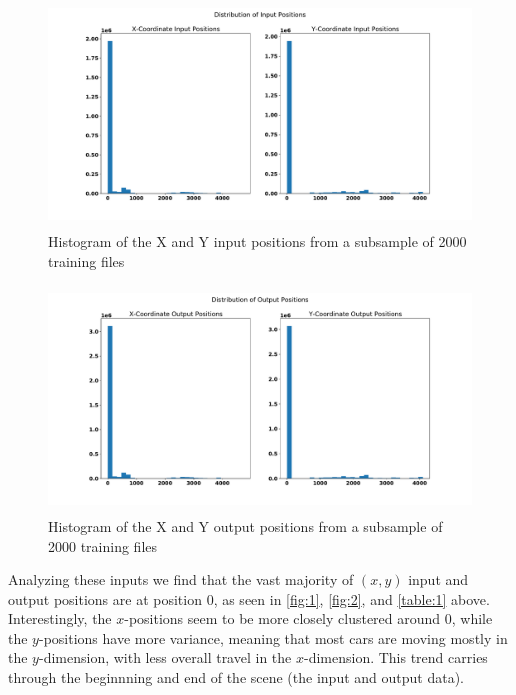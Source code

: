 \documentclass{article}
\begin{document}
        \begin{figure}[H]
            \centering
            \includegraphics[height=6cm]{figures/sample-in-position-hist.pdf}%
            \caption{Histogram of the X and Y input positions from a subsample of 2000 training files}%
            \label{fig:1}
        \end{figure}        
                
        \begin{figure}[H]
            \centering
            \includegraphics[height=6cm]{figures/sample-out-position-hist.pdf}%
            \caption{Histogram of the X and Y output positions from a subsample of 2000 training files}%
            \label{fig:2}
        \end{figure}

        Analyzing these inputs we find that the vast majority of $(x,y)$ input and output positions are at position $0$, as seen in 
        \autoref{fig:1}, \autoref{fig:2}, and \autoref{table:1} above. Interestingly, the $x$-positions seem to be 
        more closely clustered around $0$, while the $y$-positions 
        have more variance, meaning that most cars are moving mostly in the $y$-dimension, with less overall travel in the $x$-dimension. This
        trend carries through the beginnning and end of the scene (the input and output data).
        
\end{document}
